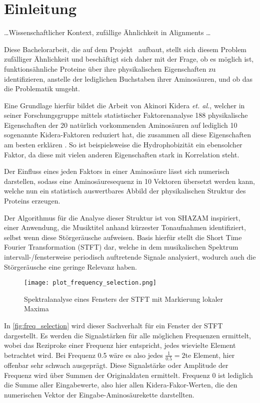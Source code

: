 \section{Einleitung} %
    \label{sec:einleitung}
    \dots Wissenschaftlicher Kontext, zufällige Ähnlichkeit in Alignments \dots

    Diese Bachelorarbeit, die auf dem Projekt \protfin\ aufbaut, stellt sich diesem Problem zufälliger Ähnlichkeit und beschäftigt sich daher mit der Frage, ob es möglich ist, funktionsähnliche Proteine über ihre physikalischen Eigenschaften zu identifizieren, anstelle der lediglichen Buchstaben ihrer Aminosäuren, und ob das die Problematik umgeht.

    Eine Grundlage hierfür bildet die Arbeit von Akinori Kidera \textit{et. al.}, welcher in seiner Forschungsgruppe mittels statistischer Faktorenanalyse 188 physikalische Eigenschaften der 20 natürlich vorkommenden Aminosäuren auf lediglich 10 sogenannte Kidera-Faktoren reduziert hat, die zusammen all diese Eigenschaften am besten erklären . So ist beispielsweise die Hydrophobizität ein ebensolcher Faktor, da diese mit vielen anderen Eigenschaften stark in Korrelation steht.

    Der Einfluss eines jeden Faktors in einer Aminosäure lässt sich numerisch darstellen, sodass eine Aminosäuresequenz in 10 Vektoren übersetzt werden kann, welche nun ein statistisch auswertbares Abbild der physikalischen Struktur des Proteins erzeugen.

    Der Algorithmus für die Analyse dieser Struktur ist von SHAZAM inspiriert, einer Anwendung, die Musiktitel anhand kürzester Tonaufnahmen identifiziert, selbst wenn diese Störgeräusche aufweisen. Basis hierfür stellt die Short Time Fourier Transformation (STFT) dar, welche in dem musikalischen Spektrum intervall-/fensterweise periodisch auftretende Signale analysiert, wodurch auch die Störgeräusche eine geringe Relevanz haben.

    \begin{wrapfigure}{r}{0.5\textwidth}
        \texttt{[image: plot\_frequency\_selection.png]}
        \caption{Spektralanalyse eines Fensters der STFT mit Markierung lokaler Maxima}
        \label{fig:freq_selection}
    \end{wrapfigure}

    In \autoref{fig:freq_selection} wird dieser Sachverhalt für ein Fenster der STFT dargestellt. Es werden die Signalstärken für alle möglichen Frequenzen ermittelt, wobei das Reziproke einer Frequenz hier entspricht, jedes wievielte Element betrachtet wird. Bei Frequenz 0.5 wäre es also jedes $\frac{1}{0.5} = 2$te Element, hier offenbar sehr schwach ausgeprägt. Diese Signalstärke oder Amplitude der Frequenz wird über Summen der Originaldaten ermittelt. Frequenz 0 ist lediglich die Summe aller Eingabewerte, also hier allen Kidera-Fakor-Werten, die den numerischen Vektor der Eingabe-Aminosäurekette darstellten.

